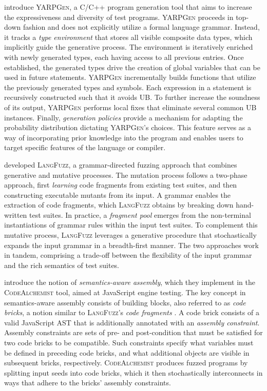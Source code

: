 \citet{livinskii2020random} introduce \textsc{YARPGen}, a C/C++ program generation
tool that aims to increase the expressiveness and diversity of test programs.
\textsc{YARPGen} proceeds in top-down fashion and does not explicitly utilize
a formal language grammar.
Instead, it tracks a \textit{type environment} that stores all visible composite
data types, which implicitly guide the generative process.
The environment is iteratively enriched with newly generated types,
each having access to all previous entries.
Once established, the generated types drive the creation of global variables
that can be used in future statements.
\textsc{YARPGen} incrementally builds functions that utilize 
the previously generated types and symbols.
Each expression in a statement is recursively constructed 
such that it avoids \Gls{UB}.
To further increase the soundness of its output, \textsc{YARPGen}
performs local fixes that eliminate several common \gls{UB} instances.
Finally, \textit{generation policies} provide a mechanism
for adapting the probability distribution dictating
\textsc{YARPGen}'s choices.
This feature serves as a way of incorporating prior knowledge into
the program and enables users to target specific features of the language
or compiler.

\citet{holler2012fuzzing} developed \textsc{LangFuzz}, a grammar-directed fuzzing
approach that combines generative and mutative processes.
The mutation process follows a two-phase approach, first \textit{learning}
code fragments from existing test suites, and then constructing executable
mutants from its input. 
A grammar enables the extraction of code fragments, which \textsc{LangFuzz}
obtains by breaking down hand-written test suites.
In practice, a \textit{fragment pool} emerges from the non-terminal
instantiations of grammar rules within the input test suites.
To complement this mutative process, \textsc{LangFuzz} leverages
a generative procedure that stochastically expands the input
grammar in a breadth-first manner.
The two approaches work in tandem, comprising a trade-off
between the flexibility of the input grammar and the
rich semantics of test suites.

\citet{han2019codealchemist} introduce the notion of \textit{semantics-aware assembly},
which they implement in the \textsc{CodeAlchemist} tool, aimed at JavaScript
engine testing.
The key concept in semantics-aware assembly consists of building blocks,
also referred to as \textit{code bricks}, a notion similar to
\textsc{LangFuzz}'s \textit{code fragments} \cite{holler2012fuzzing}.
A code brick consists of a valid JavaScript \gls{AST} that is additionally
annotated with an \textit{assembly constraint}.
Assembly constraints are sets of pre- and post-condition
that must be satisfied for two code bricks to be compatible.
Such constraints specify what variables must be defined in
preceding code bricks, and what additional objects are
visible in subsequent bricks, respectively.
\textsc{CodeAlchemist} produces fuzzed programs by splitting
input seeds into code bricks, which it then stochastically
interconnects in ways that adhere to the bricks'
assembly constraints.

